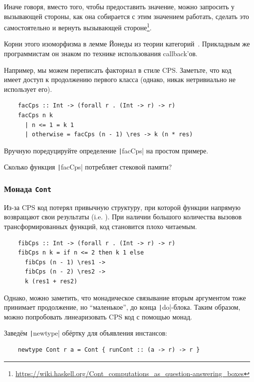 Иначе говоря, вместо того, чтобы предоставить значение, можно запросить у вызывающей стороны, как она собирается с этим значением работать, сделать это самостоятельно и вернуть вызывающей стороне\footnote{\url{https://wiki.haskell.org/Cont_computations_as_question-answering_boxes}}.

Корни этого изоморфизма в лемме Йонеды из теории категорий~\cite{hinze2010reason}.
Прикладным же программистам он знаком по технике использования callback'ов.

Например, мы можем переписать факториал в стиле CPS.
Заметьте, что код имеет доступ к продолжению первого класса (однако, никак нетривиально не использует его).
\begin{verbatim}
    facCps :: Int -> (forall r . (Int -> r) -> r)
    facCps n k
      | n <= 1 = k 1
      | otherwise = facCps (n - 1) \res -> k (n * res)
\end{verbatim}

\begin{task}
    Вручную поредуцируйте определение \texttt|facCps| на простом примере.
\end{task}

\begin{task}
    Сколько функция \texttt|facCps| потребляет стековой памяти?
\end{task}

\subsubsection{Монада \texttt{Cont}}

Из-за CPS код потерял привычную структуру, при которой функции напрямую возвращают свои результаты (i.e. ).
При наличии большого количества вызовов трансформированных функций, код становится плохо читаемым.

\begin{verbatim}
    fibCps :: Int -> (forall r . (Int -> r) -> r)
    fibCps n k = if n <= 2 then k 1 else
      fibCps (n - 1) \res1 ->
      fibCps (n - 2) \res2 ->
      k (res1 + res2)
\end{verbatim}

Однако, можно заметить, что монадическое связывание вторым аргументом тоже принимает продолжение, но ``маленькое'', до конца \texttt|do|-блока.
Таким образом, можно попробовать линеаризовать CPS код с помощью монад.

Заведём \texttt|newtype| обёртку для объявления инстансов:
\begin{verbatim}
    newtype Cont r a = Cont { runCont :: (a -> r) -> r }
\end{verbatim}

